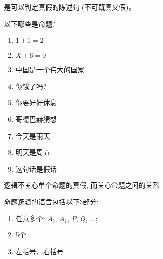 
\begin{frame}{}
  \begin{definition}[命题 (Proposition)]
    是可以判定真假的陈述句 (不可既真又假)。
  \end{definition}

  \vspace{0.30cm}
  \pause
  \begin{exampleblock}{以下哪些是命题?}
    \begin{enumerate}
      \item $1 + 1 = 2$
      \item $X + 6 = 0$
      \pause
      \item 中国是一个伟大的国家
      \item 你饿了吗?
      \item 你要好好休息
      \pause
      \item 哥德巴赫猜想
      \pause
      \item 今天是雨天
      \item 明天是周五
      \pause
      \item 这句话是假话
    \end{enumerate}
  \end{exampleblock}
\end{frame}

\begin{frame}{}
  \begin{center}

    \vspace{1.00cm}
    逻辑不关心单个命题的真假, 而关心命题之间的关系
  \end{center}
\end{frame}

\begin{frame}{}
  \begin{definition}[命题逻辑的语言]
    命题逻辑的语言包括以下3部分:
    \begin{enumerate}[(1)]
      \setlength{\itemsep}{5pt}
      \item 任意多个: $A_{0}$, $A_{1}$, $P$, $Q$, $\dots$;
      \item 5个
        
      \item 左括号、右括号
    \end{enumerate}
  \end{definition}
\end{frame}

